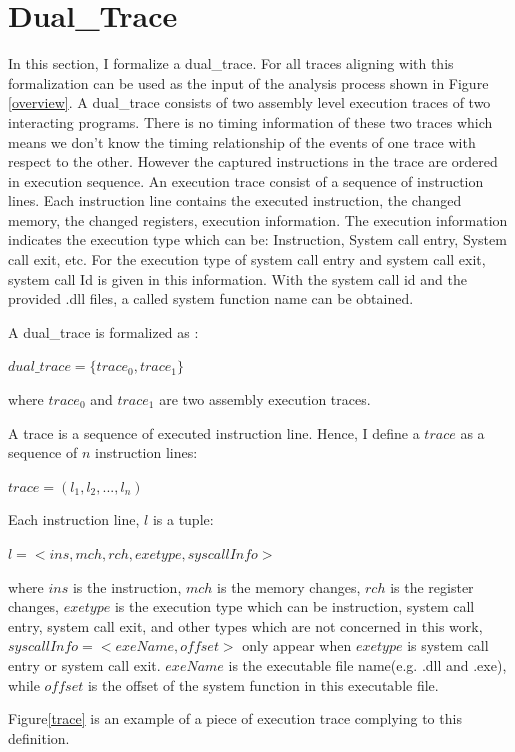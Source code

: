 \section{Dual\_Trace}
In this section, I formalize a dual\_trace. For all traces aligning with this formalization can be used as the input of the analysis process shown in Figure \ref{overview}. A dual\_trace consists of two assembly level execution traces of two interacting programs. There is no timing information of these two traces which means we don't know the timing relationship of the events of one trace with respect to the other. However the captured instructions in the trace are ordered in execution sequence. An execution trace consist of a sequence of instruction lines. Each instruction line contains the executed instruction, the changed memory, the changed registers, execution information. The execution information indicates the execution type which can be: Instruction, System call entry, System call exit, etc. For the execution type of system call entry and system call exit, system call Id is given in this information. With the system call id and the provided .dll files, a called system function name can be obtained. 

A dual\_trace is formalized as :

$dual\_trace = \lbrace trace_0, trace_1\rbrace$

where $trace_0$ and $trace_1$ are two assembly execution traces.

A trace is a sequence of executed instruction line. Hence, I define a $trace$ as a sequence of $n$ instruction lines:

$ trace = (l_1, l_2, ..., l_n)$ 

Each instruction line, $l$ is a tuple:

$l = <ins, mch, rch, exetype, syscallInfo>$

where $ins$ is the instruction, $mch$ is the memory changes, $rch$ is the register changes, $exetype$ is the execution type which can be instruction, system call entry, system call exit, and other types which are not concerned in this work, $syscallInfo = <exeName, offset>$ only appear when $exetype$ is system call entry or system call exit. $exeName$ is the executable file name(e.g. .dll and .exe), while $offset$ is the offset of the system function in this executable file.

Figure\ref{trace} is an example of a piece of execution trace complying to this definition. 


